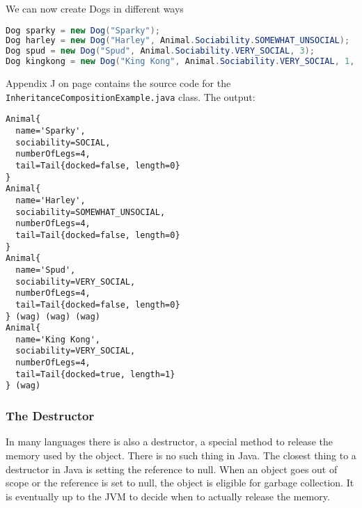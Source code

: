 We can now create Dogs in different ways
\begin{lstlisting}[language=Java]
Dog sparky = new Dog("Sparky");
Dog harley = new Dog("Harley", Animal.Sociability.SOMEWHAT_UNSOCIAL);
Dog spud = new Dog("Spud", Animal.Sociability.VERY_SOCIAL, 3);
Dog kingkong = new Dog("King Kong", Animal.Sociability.VERY_SOCIAL, 1, new Tail(true, 1));
\end{lstlisting}
Appendix J on page \pageref{App:AppendixJ} contains the source code for the \texttt{InheritanceCompositionExample.java} class.
The output:
\begin{lstlisting}
Animal{
  name='Sparky', 
  sociability=SOCIAL, 
  numberOfLegs=4, 
  tail=Tail{docked=false, length=0}
}
Animal{
  name='Harley', 
  sociability=SOMEWHAT_UNSOCIAL, 
  numberOfLegs=4, 
  tail=Tail{docked=false, length=0}
}
Animal{
  name='Spud', 
  sociability=VERY_SOCIAL, 
  numberOfLegs=4, 
  tail=Tail{docked=false, length=0}
} (wag) (wag) (wag)
Animal{
  name='King Kong', 
  sociability=VERY_SOCIAL, 
  numberOfLegs=4, 
  tail=Tail{docked=true, length=1}
} (wag)
\end{lstlisting}

\subsubsection{The Destructor}
In many languages there is also a destructor, a special method to release the memory used by the object. There is no such thing in Java. The closest thing to a destructor in Java is setting the reference to null.  When an object goes out of scope or the reference is set to null, the object is eligible for garbage collection. It is eventually up to the JVM to decide when to actually release the memory.
